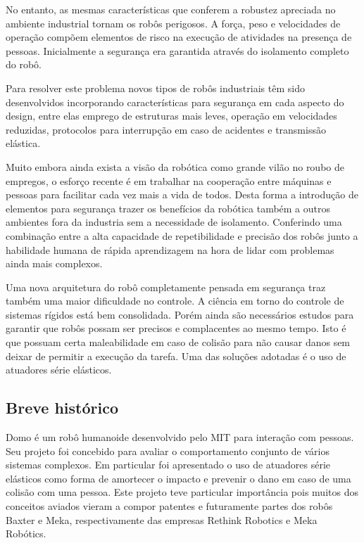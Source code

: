 No entanto, as mesmas características que conferem a robustez apreciada no ambiente industrial tornam os robôs perigosos. A força, peso e velocidades de operação compõem elementos de risco na execução de atividades na presença de pessoas. Inicialmente a segurança era garantida através do isolamento completo do robô.

Para resolver este problema novos tipos de robôs industriais têm sido desenvolvidos incorporando características para segurança em cada aspecto do design, entre elas emprego de estruturas mais leves, operação em velocidades reduzidas, protocolos para interrupção em caso de acidentes e transmissão elástica. \cite{nobody}

Muito embora ainda exista a visão da robótica como grande vilão no roubo de empregos, o esforço recente é em trabalhar na cooperação entre máquinas e pessoas para facilitar cada vez mais a vida de todos. \cite{nobody} Desta forma a introdução de elementos para segurança trazer os benefícios da robótica também a outros ambientes fora da industria sem a necessidade de isolamento. Conferindo uma combinação entre a alta capacidade de repetibilidade e precisão dos robôs junto a habilidade humana de rápida aprendizagem na hora de lidar com problemas ainda mais complexos.

Uma nova arquitetura do robô completamente pensada em segurança traz também uma maior dificuldade no controle. A ciência em torno do controle de sistemas rígidos está bem consolidada. Porém ainda são necessários estudos para garantir que robôs possam ser precisos e complacentes ao mesmo tempo. Isto é que possuam certa maleabilidade em caso de colisão para não causar danos sem deixar de permitir a execução da tarefa. Uma das soluções adotadas é o uso de atuadores série elásticos.



\subsection{Breve histórico}


Domo é um robô humanoide desenvolvido pelo MIT para interação com pessoas\cite{nobody}. Seu projeto foi concebido para avaliar o comportamento conjunto de vários sistemas complexos. Em particular foi apresentado o uso de atuadores série elásticos como forma de amortecer o impacto e prevenir o dano em caso de uma colisão com uma pessoa. Este projeto teve particular importância pois muitos dos conceitos aviados vieram a compor patentes e futuramente partes dos robôs Baxter e Meka, respectivamente das empresas Rethink Robotics e Meka Robótics. 


